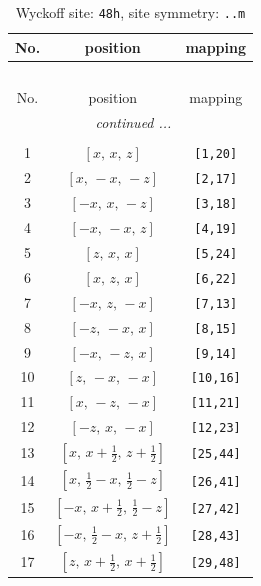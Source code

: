 \documentclass[fleqn,8pt]{jsarticle}
\begin{document}
\renewcommand{\arraystretch}{1.2}
\begin{longtable}{ccc}
\caption{Wyckoff site: {\tt 48h}, site symmetry: {\tt ..m}}
 \\
 \hline \hline
No. & position & mapping \\ \hline \endfirsthead

\multicolumn{2}{l}{\tablename\ \thetable{}} \\
 \hline \hline
No. & position & mapping \\ \hline \endhead

 \hline \hline
\multicolumn{2}{r}{\footnotesize\it continued ...} \\ \endfoot

 \hline \hline
\multicolumn{2}{r}{} \\ \endlastfoot

1 & $\left[ x,\, x,\, z \right]$ & {\tt [1,20]} \\ \hline
2 & $\left[ x,\, - x,\, - z \right]$ & {\tt [2,17]} \\ \hline
3 & $\left[ - x,\, x,\, - z \right]$ & {\tt [3,18]} \\ \hline
4 & $\left[ - x,\, - x,\, z \right]$ & {\tt [4,19]} \\ \hline
5 & $\left[ z,\, x,\, x \right]$ & {\tt [5,24]} \\ \hline
6 & $\left[ x,\, z,\, x \right]$ & {\tt [6,22]} \\ \hline
7 & $\left[ - x,\, z,\, - x \right]$ & {\tt [7,13]} \\ \hline
8 & $\left[ - z,\, - x,\, x \right]$ & {\tt [8,15]} \\ \hline
9 & $\left[ - x,\, - z,\, x \right]$ & {\tt [9,14]} \\ \hline
10 & $\left[ z,\, - x,\, - x \right]$ & {\tt [10,16]} \\ \hline
11 & $\left[ x,\, - z,\, - x \right]$ & {\tt [11,21]} \\ \hline
12 & $\left[ - z,\, x,\, - x \right]$ & {\tt [12,23]} \\ \hline
13 & $\left[ x,\, x + \frac{1}{2},\, z + \frac{1}{2} \right]$ & {\tt [25,44]} \\ \hline
14 & $\left[ x,\, \frac{1}{2} - x,\, \frac{1}{2} - z \right]$ & {\tt [26,41]} \\ \hline
15 & $\left[ - x,\, x + \frac{1}{2},\, \frac{1}{2} - z \right]$ & {\tt [27,42]} \\ \hline
16 & $\left[ - x,\, \frac{1}{2} - x,\, z + \frac{1}{2} \right]$ & {\tt [28,43]} \\ \hline
17 & $\left[ z,\, x + \frac{1}{2},\, x + \frac{1}{2} \right]$ & {\tt [29,48]} \\ \hline

\end{longtable}
\end{document}
